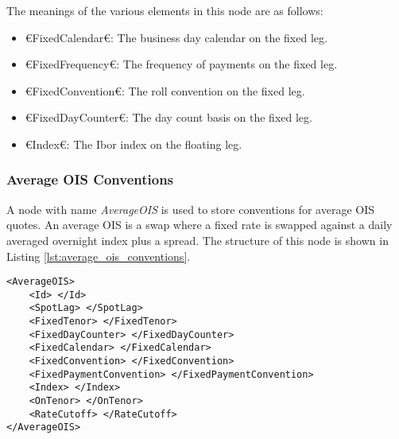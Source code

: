 The meanings of the various elements in this node are as follows:
\begin{itemize}
\item €FixedCalendar€: The business day calendar on the fixed leg.
\item €FixedFrequency€: The frequency of payments on the fixed leg.
\item €FixedConvention€: The roll convention on the fixed leg.
\item €FixedDayCounter€: The day count basis on the fixed leg.
\item €Index€: The Ibor index on the floating leg.
\end{itemize}

\subsubsection{Average OIS Conventions}
A node with name \emph{AverageOIS} is used to store conventions for average OIS quotes. An average OIS is a swap where a 
fixed rate is swapped against a daily averaged overnight index plus a spread. The structure of this node is shown in 
Listing \ref{lst:average_ois_conventions}.

{\footnotesize
\begin{lstlisting}[caption={Average OIS conventions}, label=lst:average_ois_conventions]
<AverageOIS>
	<Id> </Id>
	<SpotLag> </SpotLag>
	<FixedTenor> </FixedTenor>
	<FixedDayCounter> </FixedDayCounter>
	<FixedCalendar> </FixedCalendar>
	<FixedConvention> </FixedConvention>
	<FixedPaymentConvention> </FixedPaymentConvention>
	<Index> </Index>
	<OnTenor> </OnTenor>
	<RateCutoff> </RateCutoff>
</AverageOIS>
\end{lstlisting}
}

